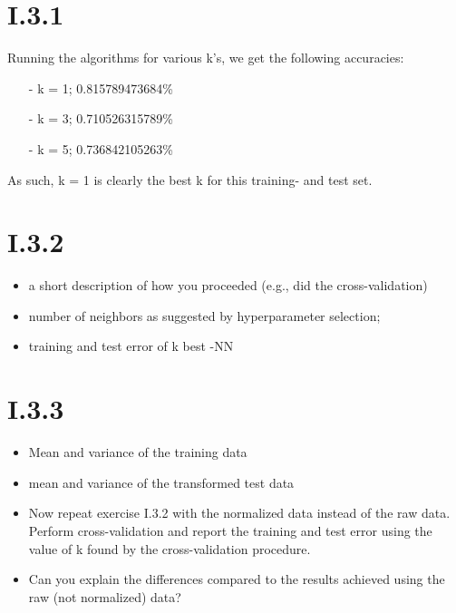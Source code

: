 \documentclass[12pt, a4paper]{article}
\begin{document}
\section{I.3.1}

Running the algorithms for various k's, we get the following accuracies:

\begin{itemize}
\item[-] k = 1; 0.815789473684\%
\item[-] k = 3; 0.710526315789\% 
\item[-] k = 5; 0.736842105263\%
\end{itemize}

As such, k = 1 is clearly the best k for this training- and test set.

\section{I.3.2}
\begin{itemize}
\item a short description of how you proceeded (e.g., did the
cross-validation)
\item number of neighbors as suggested by hyperparameter selection;
\item training and test error of k best -NN
\end{itemize}


\section{I.3.3}
\begin{itemize}
\item Mean and variance of the training data
\item mean and variance of the transformed test data
\item Now repeat exercise I.3.2 with the normalized data instead of the raw data.
Perform cross-validation and report the training and test error using the value
of k found by the cross-validation procedure.
\item Can you explain the differences
compared to the results achieved using the raw (not normalized) data?
\end{itemize}
\end{document}
